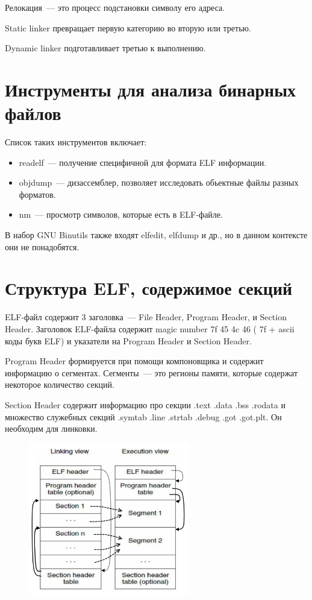 \documentclass[10pt, a5paper]{article}
\begin{document}
Релокация~--- это процесс подстановки символу его адреса. 

Static linker превращает первую категорию во вторую или третью.

Dynamic linker подготавливает третью к выполнению.

\section*{Инструменты для анализа бинарных файлов}

Список таких инструментов включает:

\begin{itemize}
  \item readelf~--- получение специфичной для формата ELF информации.
  \item objdump~--- дизассемблер, позволяет исследовать обьектные файлы разных форматов.
  \item nm~--- просмотр символов, которые есть в ELF-файле.
\end{itemize}

В набор GNU Binutils также входят elfedit, elfdump и др., но в данном контексте они не понадобятся.

\section*{Структура ELF, содержимое секций}

ELF-файл содержит 3 заголовка~--- File Header, Program Header, и Section Header.
Заголовок ELF-файла содержит magic number 7f 45 4c 46 ( 7f + ascii коды букв ELF) и указатели на Program Header и Section Header.

Program Header формируется при помощи компоновщика и содержит 
информацию о сегментах. Сегменты~--- это регионы памяти, которые содержат некоторое количество секций.

Section Header содержит информацию про секции .text .data .bss .rodata и множество служебных секций .symtab .line .strtab .debug .got .got.plt. Он необходим для линковки.
\newpage
\begin{center}
\begin{figure}[h!]
  \centering
  \includegraphics[width=7cm]{12_2018_Zhauniarovich1.png}
  \label{Zhauniarovich1}
\end{figure}
\end{center} 
\end{document}
